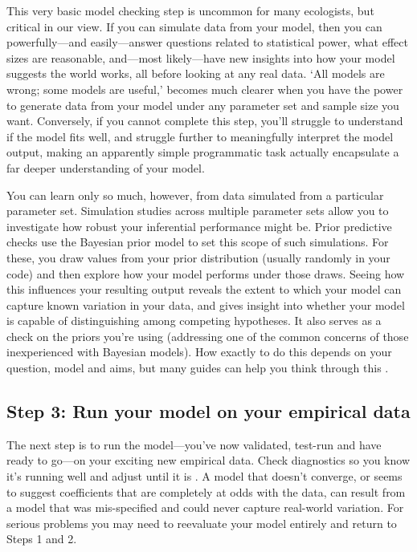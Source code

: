 \documentclass[11pt]{article}
\begin{document}
This very basic model checking step is uncommon for many ecologists, but critical in our view. If you can simulate data from your model, then you can powerfully---and easily---answer questions related to statistical power, what effect sizes are reasonable, and---most likely---have new insights into how your model suggests the world works, all before looking at any real data. `All models are wrong; some models are useful,' becomes much clearer when you have the power to generate data from your model under any parameter set and sample size you want. Conversely, if you cannot complete this step, you'll struggle to understand if the model fits well, and struggle further to meaningfully interpret the model output, making an apparently simple programmatic task actually encapsulate a far deeper understanding of your model. 

You can learn only so much, however, from data simulated from a particular parameter set. Simulation studies across multiple parameter sets allow you to investigate how robust your inferential performance might be. Prior predictive checks use the Bayesian prior model to set this scope of such simulations. For these, you draw values from your prior distribution (usually randomly in your code) and then explore how your model performs under those draws. Seeing how this influences your resulting output reveals the extent to which your model can capture known variation in your data, and gives insight into whether your model is capable of distinguishing among competing hypotheses. It also serves as a check on the priors you're using (addressing one of the common concerns of those inexperienced with Bayesian models). How exactly to do this depends on your question, model and aims, but many guides can help you think through this \citep{betanprior,wesner2021,winter2023}. \\


 \subsection*{Step 3: Run your model on your empirical data} 
 
The next step is to run the model---you've now validated, test-run and have ready to go---on your exciting new empirical data. Check diagnostics so you know it's running well and adjust until it is \citep[this includes a suite of convergence and efficiency metrics that are well-discussed elsewhere,][]{betanworkflow,gelman2020bayesian,vandeschoot2021,gabryvis}. A model that doesn't converge, or seems to suggest coefficients that are completely at odds with the data, can result from a model that was mis-specified and could never capture real-world variation. For serious problems you may need to reevaluate your model entirely and return to Steps 1 and 2.
 
\end{document}
